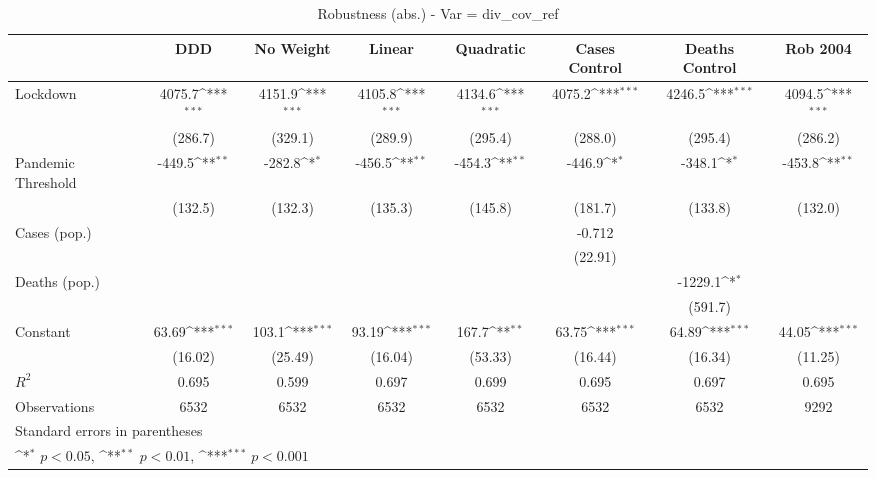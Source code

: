 \documentclass{article}
\begin{document}
{
\def\sym#1{\ifmmode^{#1}\else\(^{#1}\)\fi}
\begin{longtable}{l*{7}{c}}
\caption{Robustness (abs.) - Var = div\_cov\_ref}\\
\hline\hline\endfirsthead\hline\endhead\hline\endfoot\endlastfoot
                &\multicolumn{1}{c}{DDD}&\multicolumn{1}{c}{No Weight}&\multicolumn{1}{c}{Linear}&\multicolumn{1}{c}{Quadratic}&\multicolumn{1}{c}{Cases Control}&\multicolumn{1}{c}{Deaths Control}&\multicolumn{1}{c}{Rob 2004}\\
\hline
Lockdown        &   4075.7\sym{***}&   4151.9\sym{***}&   4105.8\sym{***}&   4134.6\sym{***}&   4075.2\sym{***}&   4246.5\sym{***}&   4094.5\sym{***}\\
                &  (286.7)         &  (329.1)         &  (289.9)         &  (295.4)         &  (288.0)         &  (295.4)         &  (286.2)         \\
Pandemic Threshold&   -449.5\sym{**} &   -282.8\sym{*}  &   -456.5\sym{**} &   -454.3\sym{**} &   -446.9\sym{*}  &   -348.1\sym{*}  &   -453.8\sym{**} \\
                &  (132.5)         &  (132.3)         &  (135.3)         &  (145.8)         &  (181.7)         &  (133.8)         &  (132.0)         \\
Cases (pop.)    &                  &                  &                  &                  &   -0.712         &                  &                  \\
                &                  &                  &                  &                  &  (22.91)         &                  &                  \\
Deaths (pop.)   &                  &                  &                  &                  &                  &  -1229.1\sym{*}  &                  \\
                &                  &                  &                  &                  &                  &  (591.7)         &                  \\
Constant        &    63.69\sym{***}&    103.1\sym{***}&    93.19\sym{***}&    167.7\sym{**} &    63.75\sym{***}&    64.89\sym{***}&    44.05\sym{***}\\
                &  (16.02)         &  (25.49)         &  (16.04)         &  (53.33)         &  (16.44)         &  (16.34)         &  (11.25)         \\
\hline
\(R^{2}\)       &    0.695         &    0.599         &    0.697         &    0.699         &    0.695         &    0.697         &    0.695         \\
Observations    &     6532         &     6532         &     6532         &     6532         &     6532         &     6532         &     9292         \\
\hline\hline
\multicolumn{8}{l}{\footnotesize Standard errors in parentheses}\\
\multicolumn{8}{l}{\footnotesize \sym{*} \(p<0.05\), \sym{**} \(p<0.01\), \sym{***} \(p<0.001\)}\\
\end{longtable}
}
\end{document}
